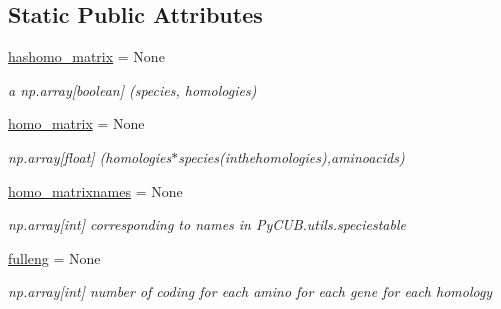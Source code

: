 \subsection*{Static Public Attributes}
\begin{DoxyCompactItemize}
\item 
\mbox{\label{class_py_c_u_b_1_1homoset_1_1_homo_set_a7c35df6a1db3f4b64a91be2417610c9e}} 
\mbox{\hyperlink{class_py_c_u_b_1_1homoset_1_1_homo_set_a7c35df6a1db3f4b64a91be2417610c9e}{hashomo\+\_\+matrix}} = None
\begin{DoxyCompactList}\small\item\em a np.\+array\mbox{[}boolean\mbox{]} (species, homologies) \end{DoxyCompactList}\item 
\mbox{\label{class_py_c_u_b_1_1homoset_1_1_homo_set_a092f90e457bce969aa9c012cd971fbb4}} 
\mbox{\hyperlink{class_py_c_u_b_1_1homoset_1_1_homo_set_a092f90e457bce969aa9c012cd971fbb4}{homo\+\_\+matrix}} = None
\begin{DoxyCompactList}\small\item\em np.\+array\mbox{[}float\mbox{]} (homologies$\ast$species(inthehomologies),aminoacids) \end{DoxyCompactList}\item 
\mbox{\label{class_py_c_u_b_1_1homoset_1_1_homo_set_afb5e078e3db98fc9e1383a5f542fc9af}} 
\mbox{\hyperlink{class_py_c_u_b_1_1homoset_1_1_homo_set_afb5e078e3db98fc9e1383a5f542fc9af}{homo\+\_\+matrixnames}} = None
\begin{DoxyCompactList}\small\item\em np.\+array\mbox{[}int\mbox{]} corresponding to names in Py\+C\+U\+B.\+utils.\+speciestable \end{DoxyCompactList}\item 
\mbox{\label{class_py_c_u_b_1_1homoset_1_1_homo_set_a44e879b2c7395a60f106e22e1df04d69}} 
\mbox{\hyperlink{class_py_c_u_b_1_1homoset_1_1_homo_set_a44e879b2c7395a60f106e22e1df04d69}{fulleng}} = None
\begin{DoxyCompactList}\small\item\em np.\+array\mbox{[}int\mbox{]} number of coding for each amino for each gene for each homology \end{DoxyCompactList}\item 

\end{DoxyCompactItemize}
